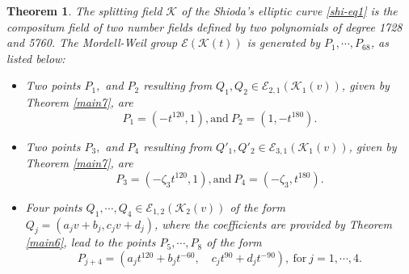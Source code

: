 \documentclass[11pt]{amsart}
\newcommand{\Q}{{\mathbb Q}}
\newcommand{\Ee}{{\mathcal E}}
\newcommand{\KK}{{\mathcal K}}
\newtheorem{thm}{Theorem}[section]
\numberwithin{equation}{section}
\numberwithin{table}{section}
\newcommand\<{\langle}
\begin{document}
\begin{thm}
	\label{main0}
	The splitting field $\KK$ of the Shioda's elliptic curve \eqref{shi-eq1} is the compositum field of two number fields defined by two polynomials of degree 1728 and 5760.
	The Mordell-Weil group $\Ee(\KK(t))$ is generated by $P_1,\cdots, P_{68}$, as listed below:
	\begin{itemize}

				\item[(1)] Two points  $P_1,$ and $ P_2$  resulting from $Q_1, Q_2\in \Ee_{2, 1}(\KK_1(v))$,  given by Theorem \ref{main7},  are  
			$$P_1=(-t^{120}, 1), \text{and}\
				P_2 = (1,  - t^{180} ).$$
			
				\item[(2)] Two points  $P_{3},$ 
				and $ P_{4}$ resulting from  $Q'_1, Q'_2 \in \Ee_{3, 1}(\KK_1(v))$,  given by Theorem \ref{main7},  are 
				$$
			P_3=(-\zeta_3 t^{120}, 1),  \text{and}\
			P_4 =  (-\zeta_3, t^{180}).$$
			
			\item[(3)] Four points    $Q_1, \cdots, Q_4 \in \Ee_{1, 2}(\KK_2(v))$ of the form
			 $Q_j=(  a_j v +b_j,      c_j v + d_j  )$,
		where the coefficients are	 provided by Theorem  \ref{main6}, lead  to the points
			$P_5, \cdots, P_8$ of the form
			$$P_{j+4}= (  a_j t^{120} +b_j t^{-60}, \quad    c_j t^{90} + d_j t^{-90}), \  \text{for} \ j=1,\cdots, 4. $$
			
			
			

		

\end{itemize}
\end{thm}
\end{document}
